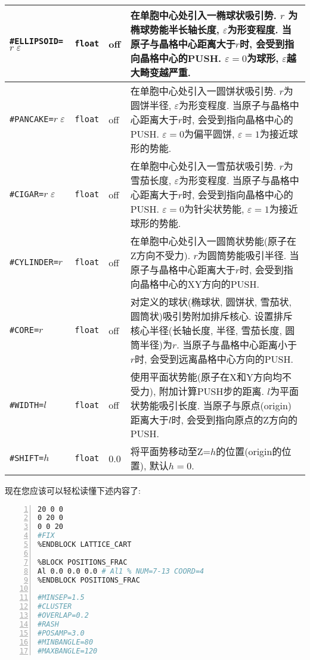 \documentclass[a4paper, 10pt]{article}
\begin{document}
\begin{center}
\begin{longtable}{m{11em}|m{4em}<{\centering}|m{3em}<{\centering}|m{15em}}
\midrule
\verb|#ELLIPSOID=|\(r\;\varepsilon\) & \verb|float|  & off & 在单胞中心处引入一椭球状吸引势. \(r\) 为椭球势能半长轴长度, \(\varepsilon\)为形变程度. 当原子与晶格中心距离大于\(r\)时, 会受到指向晶格中心的PUSH. \(\varepsilon=0\)为球形, \(\varepsilon\)越大畸变越严重. \\
\midrule
\verb|#PANCAKE=|\(r\;\varepsilon\) & \verb|float|  & off & 在单胞中心处引入一圆饼状吸引势. \(r\)为圆饼半径, \(\varepsilon\)为形变程度. 当原子与晶格中心距离大于\(r\)时, 会受到指向晶格中心的PUSH. \(\varepsilon=0\)为偏平圆饼, \(\varepsilon=1\)为接近球形的势能. \\
\midrule
\verb|#CIGAR=|\(r\;\varepsilon\) & \verb|float| & off & 在单胞中心处引入一雪茄状吸引势. \(r\)为雪茄长度, \(\varepsilon\)为形变程度. 当原子与晶格中心距离大于\(r\)时, 会受到指向晶格中心的PUSH. \(\varepsilon=0\)为针尖状势能, \(\varepsilon=1\)为接近球形的势能. \\
\midrule
\verb|#CYLINDER=|\(r\) & \verb|float| & off & 在单胞中心处引入一圆筒状势能(原子在Z方向不受力). \(r\)为圆筒势能吸引半径. 当原子与晶格中心距离大于\(r\)时, 会受到指向晶格中心的XY方向的PUSH.\\
\midrule
\verb|#CORE=|\(r\) & \verb|float| & off & 对定义的球状(椭球状, 圆饼状, 雪茄状, 圆筒状)吸引势附加排斥核心. 设置排斥核心半径(长轴长度, 半径, 雪茄长度, 圆筒半径)为\(r\). 当原子与晶格中心距离小于\(r\)时, 会受到远离晶格中心方向的PUSH.\\
\midrule
\verb|#WIDTH=|\(l\)& \verb|float| & off & 使用平面状势能(原子在X和Y方向均不受力), 附加计算PUSH步的距离. \(l\)为平面状势能吸引长度. 当原子与原点(origin)距离大于\(l\)时, 会受到指向原点的Z方向的PUSH.\\
\midrule
\verb|#SHIFT=|\(h\)& \verb|float|& 0.0  & 将平面势移动至Z=\(h\)的位置(origin的位置), 默认\(h=0\).\\
\bottomrule
\end{longtable}
\end{center}

\newpage
现在您应该可以轻松读懂下述内容了:

\begin{lstlisting}[language={bash},numbers=left]
%BLOCK LATTICE_CART
20 0 0
0 20 0
0 0 20
#FIX
%ENDBLOCK LATTICE_CART

%BLOCK POSITIONS_FRAC
Al 0.0 0.0 0.0 # Al1 % NUM=7-13 COORD=4
%ENDBLOCK POSITIONS_FRAC

#MINSEP=1.5
#CLUSTER
#OVERLAP=0.2
#RASH
#POSAMP=3.0
#MINBANGLE=80
#MAXBANGLE=120
\end{lstlisting}
\end{document}
